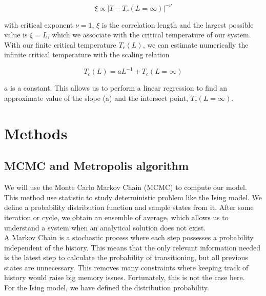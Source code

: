 \documentclass[english,notitlepage,reprint,nofootinbib]{revtex4-2}  %
\begin{document}
	\begin{equation}
		\xi \propto |T - T_c(L=\infty)|^{-\nu} \label{eq:critical exponent}
	\end{equation}

	with critical exponent $\nu=1$, $\xi$ is the correlation length and the largest possible
	value is $\xi=L$, which we associate with the critical temperature of our system. \\

	With our finite critical temperature $T_c(L)$, we can estimate numerically the infinite
	critical temperature with the scaling relation

	\begin{equation}
		T_c(L) = aL^{-1} + T_c(L=\infty) \label{eq:scaling relation}
	\end{equation}

	$a$ is a constant. This allows us to perform a linear regression to find an approximate value
	of the slope (a) and the intersect point, $T_c(L=\infty)$.
	
	

	\section{Methods}\label{sec:methods}
	\subsection{MCMC and Metropolis algorithm} \label{subsec:mcmc}
	We will use the Monte Carlo Markov Chain (MCMC) to compute our model. This method use
	statistic to study deterministic problem like the Ising model. We define a probability
	distribution function and sample states from it. After some iteration or cycle, we obtain
	an ensemble of average, which allows us to understand a system when an analytical
	solution does not exist. \\

	A Markov Chain is a stochastic process where each step possesses a probability
	independent of the history. This means that the only relevant information needed is the
	latest step to calculate the probability of transitioning, but all previous states are
	unnecessary. This removes many constraints where keeping track of history would
	raise big memory issues. Fortunately, this is not the case here. \\

	For the Ising model, we have defined the distribution probability.
\end{document}
